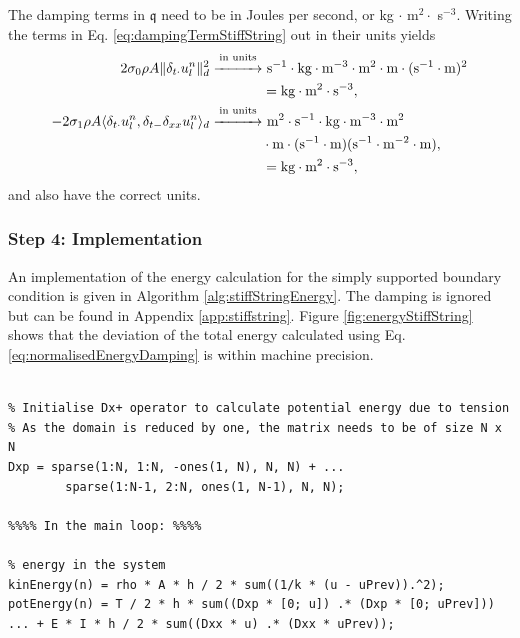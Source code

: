 {The damping terms in $\mathfrak{q}$ need to be in Joules per second, or kg $\cdot$ m$^2 \cdot$ s$^{-3}$. Writing the terms in Eq. \eqref{eq:dampingTermStiffString} out in their units yields
\begin{align*}
    2\sz \rho A \lVert\dtd\uln\rVert_d^2\overset{\text{in units}}{\xrightarrow{\hspace*{1cm}}}&\ \text{s}^{-1}\cdot\text{kg}\cdot\text{m}^{-3}\cdot\text{m}^2\cdot \text{m}\cdot(\text{s}^{-1}\cdot\text{m})^2 \\
    &= \text{kg} \cdot \text{m}^2 \cdot \text{s}^{-3},\\
    - 2 \so \rho A \langle \dtd \uln, \dtm \dxx \uln \rangle_d \overset{\text{in units}}{\xrightarrow{\hspace*{1cm}}}&\  \text{m}^2\cdot\text{s}^{-1}\cdot\text{kg}\cdot\text{m}^{-3}\cdot\text{m}^2\\
    &\cdot\text{m}\cdot(\text{s}^{-1}\cdot\text{m})(\text{s}^{-1}\cdot\text{m}^{-2}\cdot \text{m}),\\
    &= \text{kg} \cdot \text{m}^2 \cdot \text{s}^{-3},
\end{align*}
and also have the correct units.
\subsubsection{Step 4: Implementation}
An implementation of the energy calculation for the simply supported boundary condition is given in Algorithm \ref{alg:stiffStringEnergy}. The damping is ignored but can be found in Appendix \ref{app:stiffstring}.  Figure \ref{fig:energyStiffString} shows that the deviation of the total energy calculated using Eq. \eqref{eq:normalisedEnergyDamping} is within machine precision.

\setlstMAT
\begin{lstlisting}[caption=Calculating $\h$ for the simply supported boundary condition., label=alg:stiffStringEnergy]
%%%% Before the main loop: %%%%

% Initialise Dx+ operator to calculate potential energy due to tension
% As the domain is reduced by one, the matrix needs to be of size N x N
Dxp = sparse(1:N, 1:N, -ones(1, N), N, N) + ...
        sparse(1:N-1, 2:N, ones(1, N-1), N, N);

%%%% In the main loop: %%%%

% energy in the system
kinEnergy(n) = rho * A * h / 2 * sum((1/k * (u - uPrev)).^2);
potEnergy(n) = T / 2 * h * sum((Dxp * [0; u]) .* (Dxp * [0; uPrev])) ... + E * I * h / 2 * sum((Dxx * u) .* (Dxx * uPrev));
\end{lstlisting}

}
